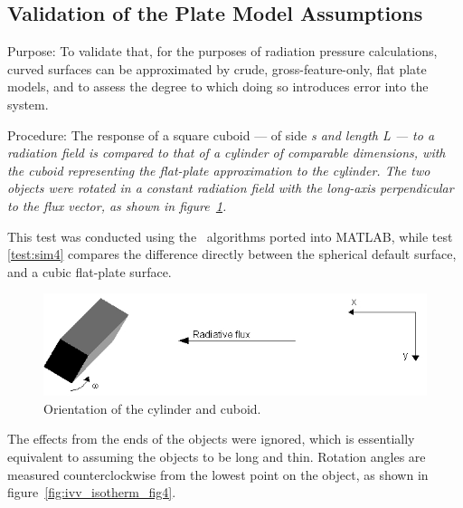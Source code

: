 \subsection{Validation of the Plate Model Assumptions}
\label{sec:platemodelvalid}
  \label{test:plate_model}
  \begin{description}
   \item{Purpose:}\newline
    To validate that, for the purposes of radiation
    pressure calculations, curved surfaces can be
    approximated by crude, gross-feature-only, flat plate
    models, and to assess the degree to which doing so
    introduces error into the system.

   \item{Procedure:}\newline
    The response of a square cuboid --- of side \it s \rm and length \it L
    \rm --- to a radiation field is compared
    to that of a cylinder of comparable dimensions, with the
    cuboid representing the flat-plate approximation to the
    cylinder.  The two objects were rotated in a constant radiation
    field with the long-axis perpendicular to the flux vector, as shown in
    figure~\ref{fig:ivv_isotherm_fig1}.

    This test was conducted using the \JEODid\ algorithms ported into MATLAB, while test \vref{test:sim4} compares the difference directly between the spherical default surface, and a cubic flat-plate surface.

    \begin{figure}[!ht]
      \begin{center}
      \includegraphics[width=150mm]{figs/isoth_app/iso_app_figs1.jpg}
      \end{center}
      \caption{Orientation of the cylinder and cuboid.}
      \label{fig:ivv_isotherm_fig1}
    \end{figure}

    The effects from the ends of the objects were ignored, which is
    essentially equivalent to assuming the objects to be long and thin.
    Rotation angles
    are measured counterclockwise from the lowest point on the
    object, as shown in figure~\ref{fig:ivv_isotherm_fig4}.


\end{description}
